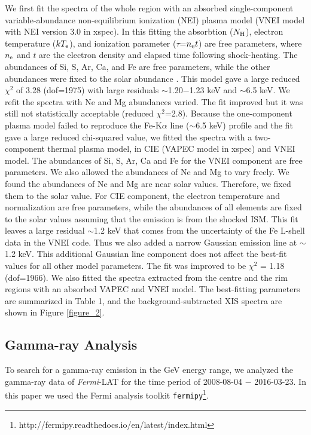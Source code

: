 \documentclass[useAMS,usenatbib]{mn2e}
\begin{document}
We first fit the spectra of the whole region with an absorbed \citep[TBABS:][]{Wi00} single-component variable-abundance non-equilibrium ionization (NEI) plasma model (VNEI model with NEI version 3.0 in {\sc xspec}). In this fitting the absorbtion ($N_{\rm H}$), electron temperature ($kT_{\rm e}$), and ionization parameter ($\tau$=$n_{\rm e}t$) are free parameters, where $n_{\rm e}$ and $t$ are the electron density and elapsed time following shock-heating. The abundances of Si, S, Ar, Ca, and Fe are free parameters, while the other abundances were fixed to the solar abundance \citep {Wi00}. This model gave a large reduced ${\chi}^2$ of 3.28 (dof=1975) with large residuals $\sim$1.20$-$1.23 keV and $\sim$6.5 keV. We refit the spectra with Ne and Mg abundances varied. The fit improved but it was still not statistically acceptable (reduced ${\chi}^2$=2.8). Because the one-component plasma model failed to reproduce the Fe-K$\alpha$ line ($\sim$6.5 keV) profile and the fit gave a large reduced chi-squared value, we fitted the spectra with a two-component thermal plasma model, in CIE (VAPEC model in {\sc xspec}) and VNEI model. The abundances of Si, S, Ar, Ca and Fe for the VNEI component are free parameters. We also allowed the abundances of Ne and Mg to vary freely. We found the abundances of Ne and Mg are near solar values. Therefore, we fixed them to the solar value. For CIE component, the electron temperature and normalization are free parameters, while the abundances of all elements are fixed to the solar values assuming that the emission is from the shocked ISM. This fit leaves a large residual $\sim$1.2 keV that comes from the uncertainty of the Fe L-shell data in the VNEI code. Thus we also added a narrow Gaussian emission line at $\sim$1.2 keV. This additional Gaussian line component does not affect the best-fit values for all other model parameters. The fit was improved to be ${\chi}^2$ = 1.18 (dof=1966). We also fitted the spectra extracted from the centre and the rim regions with an absorbed VAPEC and VNEI model. The best-fitting parameters are summarized in Table 1, and the background-subtracted XIS spectra are shown in Figure \ref{figure_2}.  

\subsection {Gamma-ray Analysis}
To search for a gamma-ray emission in the GeV energy range, we analyzed the gamma-ray data of {\it Fermi}-LAT for the time period of 2008-08-04 $-$ 2016-03-23. In this paper we used the Fermi analysis toolkit \texttt{fermipy}\footnote{http://fermipy.readthedocs.io/en/latest/index.html}.   
\end{document}
